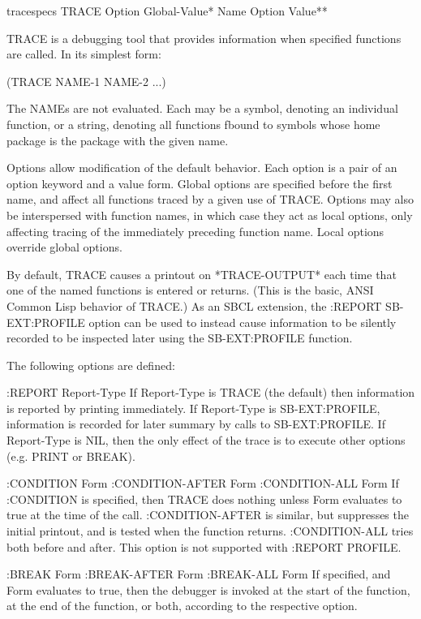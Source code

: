 \documentclass[10pt,english]{book}
\begin{document}
\begin{macro}{trace}{\rest specs}
  TRACE {Option Global-Value}* {Name {Option Value}*}*

TRACE is a debugging tool that provides information when specified
functions are called. In its simplest form:

       (TRACE NAME-1 NAME-2 ...)

The NAMEs are not evaluated. Each may be a symbol, denoting an
individual function, or a string, denoting all functions fbound to
symbols whose home package is the package with the given name.

Options allow modification of the default behavior. Each option is a
pair of an option keyword and a value form. Global options are
specified before the first name, and affect all functions traced by a
given use of TRACE. Options may also be interspersed with function
names, in which case they act as local options, only affecting tracing
of the immediately preceding function name. Local options override
global options.

By default, TRACE causes a printout on *TRACE-OUTPUT* each time that
one of the named functions is entered or returns. (This is the basic,
ANSI Common Lisp behavior of TRACE.) As an SBCL extension, the
:REPORT SB-EXT:PROFILE option can be used to instead cause information
to be silently recorded to be inspected later using the SB-EXT:PROFILE
function.

The following options are defined:

   :REPORT Report-Type
       If Report-Type is TRACE (the default) then information is reported
       by printing immediately. If Report-Type is SB-EXT:PROFILE, information
       is recorded for later summary by calls to SB-EXT:PROFILE. If
       Report-Type is NIL, then the only effect of the trace is to execute
       other options (e.g. PRINT or BREAK).

   :CONDITION Form
   :CONDITION-AFTER Form
   :CONDITION-ALL Form
       If :CONDITION is specified, then TRACE does nothing unless Form
       evaluates to true at the time of the call. :CONDITION-AFTER is
       similar, but suppresses the initial printout, and is tested when the
       function returns. :CONDITION-ALL tries both before and after.
       This option is not supported with :REPORT PROFILE.

   :BREAK Form
   :BREAK-AFTER Form
   :BREAK-ALL Form
       If specified, and Form evaluates to true, then the debugger is invoked
       at the start of the function, at the end of the function, or both,
       according to the respective option.


\end{macro}
\end{document}
